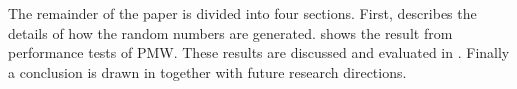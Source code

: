 The remainder of the paper is divided into four sections.
First,  describes the details of how the random numbers are generated.
 shows the result from performance tests of PMW.
These results are discussed and evaluated in .
Finally a conclusion is drawn in  together with future research directions.

